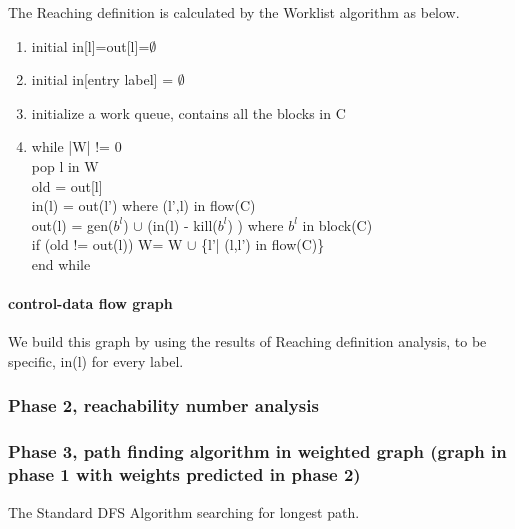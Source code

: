 The Reaching definition is calculated by the Worklist algorithm as below.
\begin{enumerate}
    \item initial in[l]=out[l]=$\emptyset$
    \item initial in[entry label] = $\emptyset$
    \item initialize a work queue, contains all the blocks in C
    \item while |W| != 0 \\
         pop l in W\\
          old = out[l]\\
          in(l) =  out(l') where (l',l) in flow(C)\\
           out(l) = gen($b^l$) $\cup$ (in(l) - kill($b^l$) ) where $b^l$ in block(C)   \\
          if (old != out(l)) W= W $\cup$ \{l'| (l,l') in flow(C)\}\\
          end while
\end{enumerate}

 \paragraph{control-data flow graph}
 We build this graph by using the results of Reaching definition analysis, to be specific, in(l) for every label. 

\subsubsection{Phase 2, reachability number analysis}

\subsubsection{Phase 3, path finding algorithm in weighted graph (graph in phase 1 with weights predicted in phase 2) }
The Standard DFS Algorithm searching for longest path.